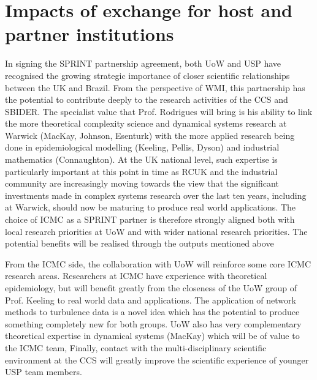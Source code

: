 \section{Impacts of exchange for host and partner institutions}
In signing the SPRINT partnership agreement, both UoW and USP have recognised 
the growing strategic importance of closer scientific relationships between the 
UK and Brazil.
From the perspective of WMI, this partnership has the potential to  contribute 
deeply to the research activities of the CCS and SBIDER. The specialist value 
that Prof. Rodrigues will bring is his ability to link the more theoretical 
complexity science and dynamical systems research at Warwick (MacKay, Johnson, 
Esenturk) with the more applied research being done in epidemiological 
modelling (Keeling, Pellis, Dyson) and industrial mathematics (Connaughton). At 
the UK national level, such expertise is particularly important at this point 
in time as RCUK and the industrial community are increasingly moving towards 
the view that the significant investments made in complex systems research over 
the last ten years, including at Warwick, should now be maturing to produce 
real world applications.  The choice of ICMC as a SPRINT partner is therefore 
strongly aligned both with local research priorities at UoW and with wider 
national research priorities. The potential benefits will be realised through 
the outputs mentioned above

From the ICMC side, the collaboration with UoW will reinforce some core ICMC research areas. Researchers at ICMC have experience with theoretical epidemiology, but will benefit greatly from the closeness of the UoW group of Prof. Keeling to real world data and applications. The application of network methods to
turbulence data is a novel idea which has the potential to produce something completely new
for both groups. UoW also has very complementary theoretical expertise in dynamical systems (MacKay) which will be of value to the ICMC team, Finally, contact with the multi-disciplinary scientific environment at the CCS will greatly improve the scientific experience of younger USP team members.



